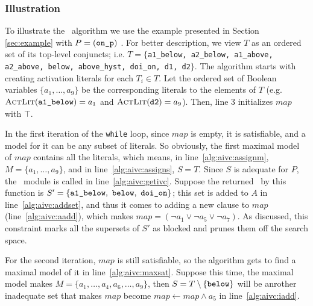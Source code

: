 \subsubsection{Illustration}
\label{sec:illust}
To illustrate the \aivcalg ~algorithm we use the example presented in Section \ref{sec:example} with $P = ({\small \texttt{on\_p}})$ .
For better description, we view $T$ as an ordered set of its top-level conjuncts; i.e. $T = \{${\small \texttt{a1\_below, a2\_below, a1\_above, a2\_above, below, above\_hyst, doi\_on, d1, d2}}$\}$.
The algorithm starts with creating activation literals for each $T_i \in T$. Let the ordered set of Boolean variables $\{ a_1, \ldots , a_9 \}$ be the corresponding literals to the elements of $T$ (e.g. $\actlit ({ \small \texttt{a1\_below}}) = a_1$ and $\actlit ({\small \texttt{d2}}) = a_9$). Then, line 3 initializes $map$ with $\top$.

In the first iteration of the \texttt{while} loop, since $map$ is
empty, it is satisfiable, and a model for it can be any subset of
literals. So obviously, the first maximal model of $map$ contains all
the literals, which means, in line~\ref{alg:aivc:assignm}, $M = \{a_1,
\ldots, a_9\}$, and in line~\ref{alg:aivc:assigns}, $S = T$. Since $S$
is adequate for $P$, the \getivc ~module is called in
line~\ref{alg:aivc:getivc}. Suppose the returned \mivc\ by this function
is $S' = \{ { \small \texttt{a1\_below},~\texttt{below},
  ~\texttt{doi\_on}}\}$; this set is added to $A$ in
line~\ref{alg:aivc:addset}, and thus it comes to adding a new clause
to $map$ (line~\ref{alg:aivc:aadd}), which makes $map = (\neg a_1 \vee
\neg a_5 \vee \neg a_7)$. As discussed, this constraint
marks all the supersets of $S'$ as blocked and prunes them off the
search space.

For the second iteration, $map$ is still satisfiable,
so the algorithm gets to find a maximal model of it in line~\ref{alg:aivc:maxsat}. Suppose this time, the maximal model makes $M = \{a_1, \ldots, a_4, a_6, \ldots, a_9\}$, then $S = T \setminus \{ {\small \texttt{below}}\} $ will be anrother inadequate set that makes $map$ become
$map \leftarrow map \wedge a_5$
in line~\ref{alg:aivc:iadd}.

